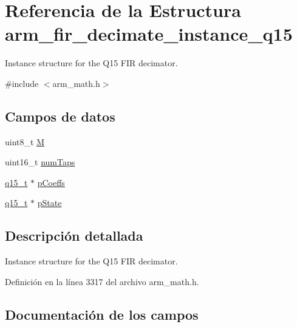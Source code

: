 \hypertarget{structarm__fir__decimate__instance__q15}{}\section{Referencia de la Estructura arm\+\_\+fir\+\_\+decimate\+\_\+instance\+\_\+q15}
\label{structarm__fir__decimate__instance__q15}


Instance structure for the Q15 F\+IR decimator.  




{\ttfamily \#include $<$arm\+\_\+math.\+h$>$}

\subsection*{Campos de datos}
\begin{DoxyCompactItemize}
\item 
uint8\+\_\+t \hyperlink{structarm__fir__decimate__instance__q15_ae2c8107d00d3c9942e7a20fc598edecf}{M}
\item 
uint16\+\_\+t \hyperlink{structarm__fir__decimate__instance__q15_a751941891e47f522a7f5375fe8990aac}{num\+Taps}
\item 
\hyperlink{arm__math_8h_ab5a8fb21a5b3b983d5f54f31614052ea}{q15\+\_\+t} $\ast$ \hyperlink{structarm__fir__decimate__instance__q15_a7ca181a37f714d174445f486bebce26f}{p\+Coeffs}
\item 
\hyperlink{arm__math_8h_ab5a8fb21a5b3b983d5f54f31614052ea}{q15\+\_\+t} $\ast$ \hyperlink{structarm__fir__decimate__instance__q15_ae29dfdb736374fcddaeaec4b7770170c}{p\+State}
\end{DoxyCompactItemize}


\subsection{Descripción detallada}
Instance structure for the Q15 F\+IR decimator. 

Definición en la línea 3317 del archivo arm\+\_\+math.\+h.



\subsection{Documentación de los campos}
